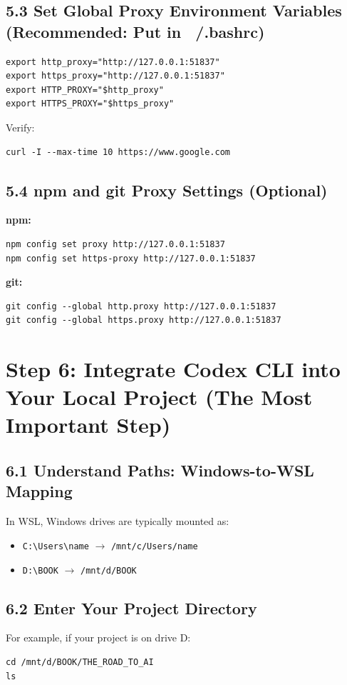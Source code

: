 \documentclass[11pt,a4paper]{article}
\begin{document}
\subsection{5.3 Set Global Proxy Environment Variables (Recommended: Put in ~/.bashrc)}
\begin{lstlisting}
export http_proxy="http://127.0.0.1:51837"
export https_proxy="http://127.0.0.1:51837"
export HTTP_PROXY="$http_proxy"
export HTTPS_PROXY="$https_proxy"
\end{lstlisting}
Verify:
\begin{lstlisting}
curl -I --max-time 10 https://www.google.com
\end{lstlisting}

\subsection{5.4 npm and git Proxy Settings (Optional)}
\textbf{npm:}
\begin{lstlisting}
npm config set proxy http://127.0.0.1:51837
npm config set https-proxy http://127.0.0.1:51837
\end{lstlisting}
\textbf{git:}
\begin{lstlisting}
git config --global http.proxy http://127.0.0.1:51837
git config --global https.proxy http://127.0.0.1:51837
\end{lstlisting}

\section{Step 6: Integrate Codex CLI into Your Local Project (The Most Important Step)}
\subsection{6.1 Understand Paths: Windows-to-WSL Mapping}
In WSL, Windows drives are typically mounted as:
\begin{itemize}[leftmargin=1.5em]
  \item \texttt{C:\textbackslash Users\textbackslash name} $\rightarrow$ \texttt{/mnt/c/Users/name}
  \item \texttt{D:\textbackslash BOOK} $\rightarrow$ \texttt{/mnt/d/BOOK}
\end{itemize}

\subsection{6.2 Enter Your Project Directory}
For example, if your project is on drive D:
\begin{lstlisting}
cd /mnt/d/BOOK/THE_ROAD_TO_AI
ls
\end{lstlisting}
\end{document}
